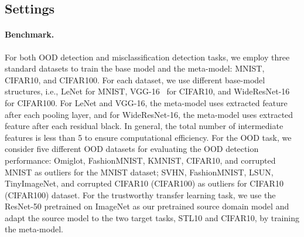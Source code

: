 \subsection{Settings}\label{sec:setting}
\paragraph{Benchmark.}
For both OOD detection and misclassification detection tasks, we employ three standard datasets to train the base model and the meta-model: MNIST, CIFAR10, and CIFAR100. For each dataset, we use different base-model structures, i.e., LeNet for MNIST, VGG-16~\citep{simonyan2014very} for CIFAR10, and WideResNet-16~\citep{zagoruyko2016wide} for CIFAR100. For LeNet and VGG-16, the meta-model uses extracted feature after each pooling layer, and for WideResNet-16, the meta-model uses extracted feature after each residual black. In general, the total number of intermediate features is less than 5 to ensure computational efficiency. For the OOD task, we consider five different OOD datasets for evaluating the OOD detection performance: Omiglot, FashionMNIST, KMNIST, CIFAR10, and corrupted MNIST as outliers for the MNIST dataset; SVHN, FashionMNIST, LSUN, TinyImageNet, and corrupted CIFAR10 (CIFAR100) as outliers for CIFAR10 (CIFAR100) dataset. For the trustworthy transfer learning task, we use the ResNet-50 pretrained on ImageNet as our pretrained source domain model and adapt the source model to the two target tasks, STL10 and CIFAR10, by training the meta-model.


